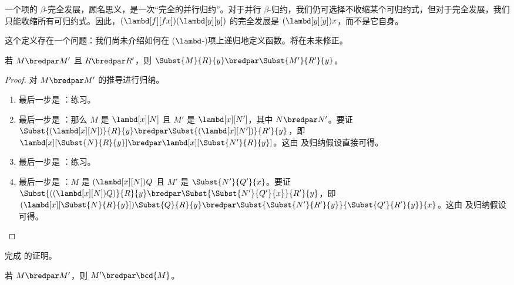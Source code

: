 \documentclass[../../../include/open-logic-section]{subfiles}
\begin{document}
一个项的 $\beta$-完全发展，顾名思义，是一次“完全的并行归约”。对于并行 $\beta$-归约，我们仍可选择不收缩某个可归约式，但对于完全发展，我们只能收缩所有可归约式。因此，$(\lambd[f][fx])(\lambd[y][y])$ 的完全发展是 $(\lambd[y][y])x$，而不是它自身。

\begin{editorial}
  这个定义存在一个问题：我们尚未介绍如何在 ($\lambd$-)项上递归地定义函数。将在未来修正。
\end{editorial}

\begin{lem}
  若 $M \bredpar M'$ 且 $R \bredpar R'$，则 $\Subst{M}{R}{y}
  \bredpar \Subst{M'}{R'}{y}$。
\end{lem}

\begin{proof}
  对 $M \bredpar M'$ 的推导进行归纳。
  \begin{enumerate}
    \item 最后一步是 ：练习。
    \item 最后一步是 ：那么 $M$ 是 $\lambd[x][N]$ 且 $M'$ 是 $\lambd[x][N']$，其中 $N \bredpar N'$。要证 $\Subst{(\lambd[x][N])}{R}{y} \bredpar
      \Subst{(\lambd[x][N'])}{R'}{y}$，即 $\lambd[x][\Subst{N}{R}{y}] \bredpar
      \lambd[x][\Subst{N'}{R}{y}]$。这由  及归纳假设直接可得。
    \item 最后一步是 ：练习。
    \item 最后一步是 ：$M$ 是 $(\lambd[x][N])Q$ 且 $M'$ 是 $\Subst{N'}{Q'}{x}$。要证 $\Subst{((\lambd[x][N])Q)}{R}{y} \bredpar
      \Subst{\Subst{N'}{Q'}{x}}{R'}{y}$，即 $(\lambd[x][\Subst{N}{R}{y}])\Subst{Q}{R}{y} \bredpar
      \Subst{\Subst{N'}{R'}{y}}{\Subst{Q'}{R'}{y}}{x}$。这由  及归纳假设可得。
  \end{enumerate}
\end{proof}

\begin{prob}
  完成  的证明。
\end{prob}

\begin{lem}
  若 $M \bredpar M'$，则 $M' \bredpar \bcd{M}$。
\end{lem}
\end{document}
